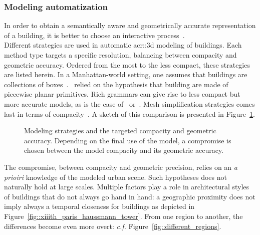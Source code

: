         \subsubsection{Modeling automatization}
            In order to obtain a semantically aware and geometrically accurate representation of a building, it is better to choose an interactive process~\parencite{musialski2013survey}.\\
            Different strategies are used in automatic \gls{acr::3d} modeling of buildings.
            Each method type targets a specific resolution, balancing between compacity and geometric accuracy.
            Ordered from the most to the less compact, these strategies are listed herein.
            In a Manhattan-world setting, one assumes that buildings are collections of boxes~\parencite{vanegas2010building, li2016manhattan}.~\textcite{lafarge_ijcv12, nan2017polyfit}
            relied on the hypothesis that building are made of piecewise planar primitives.
            Rich grammars can give rise to less compact but more accurate models, as is the case of~\textcite{demir2015procedural} or~\textcite{zeng2018neural}.
            Mesh simplification strategies comes last in terms of compacity~\parencite{verdie2015lod, zhou20102}.
            A sketch of this comparison is presented in Figure~\ref{fig::modeling_strategies}.\\
            \begin{figure}[htpb]
                \centering
                            
                \caption{
                    \label{fig::modeling_strategies} Modeling strategies and the targeted compacity and geometric accuracy.
                    Depending on the final use of the model, a compromise is chosen between the model compacity and its geometric accuracy.
                }
            \end{figure}
            The compromise, between compacity and geometric precision, relies on an \textit{a prioiri} knowledge of the modeled urban scene.
            Such hypotheses does not naturally hold at large scales.
            Multiple factors play a role in architectural styles of buildings that do not always go hand in hand:
            a geographic proximity does not imply always a temporal closeness for buildings as depicted in Figure~\ref{fig::xiiith_paris_haussmann_tower}.
            From one region to another, the differences become even more overt: \textit{c.f.} Figure~\ref{fig::different_regions}.
